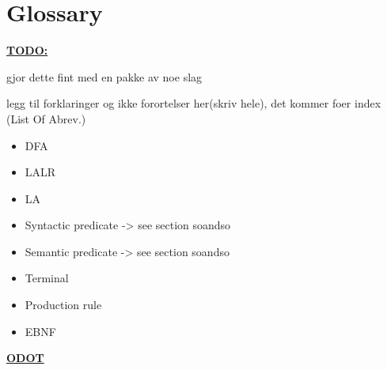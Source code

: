 \chapter{Glossary}

\underline{\textbf{\LARGE TODO:}} 

gjor dette fint med en pakke av noe slag

legg til forklaringer og ikke forortelser her(skriv hele), det kommer foer index (List Of Abrev.)

\begin{itemize}
\item DFA 
\item LALR
\item LA
\item Syntactic predicate -> see section soandso
\item Semantic predicate -> see section soandso
\item Terminal
\item Production rule
\item EBNF
\end{itemize}

\underline{\textbf{\LARGE ODOT}} 
